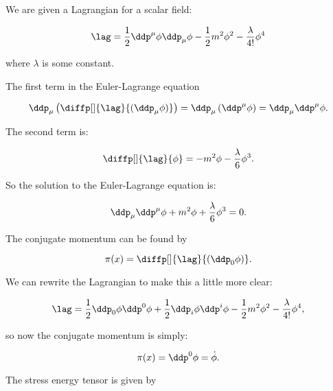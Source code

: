 \section{}

We are given a Lagrangian for a scalar field:

\begin{equation}
    \lag = \frac{1}{2}\ddp^{\mu}\phi\ddp_{\mu}\phi - \frac{1}{2}m^2\phi^2 - \frac{\lambda}{4!}\phi^4
\end{equation}

where $\lambda$ is some constant.

The first term in the Euler-Lagrange equation

\begin{equation*}
    \ddp_{\mu}\left( \diffp[]{\lag}{(\ddp_{\mu}\phi)} \right) = \ddp_{\mu} \left( \ddp^{\mu}\phi \right) = \ddp_{\mu}\ddp^{\mu}\phi.
\end{equation*}

The second term is:

\begin{equation*}
    \diffp[]{\lag}{\phi} = -m^2\phi - \frac{\lambda}{6}\phi^3.
\end{equation*}

So the solution to the Euler-Lagrange equation is:

\begin{equation*}
    \ddp_{\mu}\ddp^{\mu}\phi + m^2\phi + \frac{\lambda}{6}\phi^3 = 0.
\end{equation*}

The conjugate momentum can be found by

\begin{equation}
    \pi(x) = \diffp[]{\lag}{(\ddp_0\phi)}.
\end{equation}

We can rewrite the Lagrangian to make this a little more clear:

\begin{equation*}
    \lag = \frac{1}{2}\ddp_0\phi\ddp^0\phi + \frac{1}{2}\ddp_i\phi\ddp^i\phi - \frac{1}{2}m^2\phi^2 - \frac{\lambda}{4!}\phi^4,
\end{equation*}

so now the conjugate momentum is simply:

\begin{equation*}
    \pi(x) = \ddp^0\phi = \dot{\phi}.
\end{equation*}

The stress energy tensor is given by


